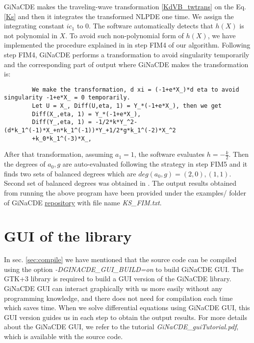 \documentclass[prd,aps,floats,showkeys,nofootinbib,notitlepage]{revtex4}
\begin{document}
	GiNaCDE makes the traveling-wave transformation \eqref{KdVB_twtrans} 
	on the Eq. \eqref{Ks} and then it integrates the transformed NLPDE one time. We assign the integrating constant $ic_1$ to $0$. The software automatically detects that $h(X)$ is not polynomial in $X$. To avoid such non-polynomial form of $h(X)$, we have implemented the procedure explained in \cite{mirza} in step FIM4 of our algorithm. Following step FIM4, GiNaCDE performs a transformation to avoid singularity temporarily and the corresponding part of output where GiNaCDE makes the transformation is:
	\begin{verbatim}
		We make the transformation, d xi = (-1+e*X_)*d eta to avoid singularity -1+e*X_ = 0 temporarily.
		Let U = X_, Diff(U,eta, 1) = Y_*(-1+e*X_), then we get
		Diff(X_,eta, 1) = Y_*(-1+e*X_),
		Diff(Y_,eta, 1) = -1/2*k*Y_^2-(d*k_1^(-1)*X_+n*k_1^(-1))*Y_+1/2*g*k_1^(-2)*X_^2
		+k_0*k_1^(-3)*X_,
	\end{verbatim}
	After that transformation, assuming $a_1=1$, the software evaluates $h=-\frac{k}{2}$. Then the degrees of $a_0,g$ are auto-evaluated following the strategy in step FIM5 and it finds two sets of balanced degrees which are $deg(a_0,g)=(2,0),(1,1)$. Second set of balanced degrees was obtained in \cite{mirza}.  
	The output results obtained from running the above program have been provided under the examples/ folder of GiNaCDE \href{https://github.com/mithun218/GiNaCDE}{repository} with file name \textit{KS\_FIM.txt}.
		
	
	
	\section{GUI of the library}\label{gui}
	In sec. \ref{sec:compile} we have mentioned that the source code can be compiled using the option {\em -DGINACDE\_GUI\_BUILD=on} to build GiNaCDE GUI. The GTK+3 library is required to build a GUI version of the GiNaCDE library. GiNaCDE GUI can interact graphically with us more easily without any programming knowledge, and there does not need for compilation each time which saves time. When we solve differential equations using GiNaCDE GUI, this GUI version guides us in each step to obtain the output results. For more details about the GiNaCDE GUI, we refer to the tutorial \textit{GiNaCDE\_guiTutorial.pdf}, which is available with the source code.
	
\end{document}

